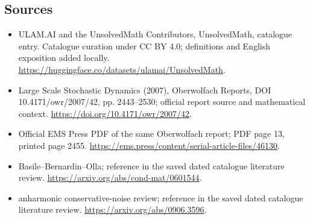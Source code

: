 \documentclass[11pt]{article}
\begin{document}
\subsection{Sources}
\begin{itemize}
\item[\hypertarget{source:statement:1}{S1}] ULAM.AI and the UnsolvedMath Contributors, UnsolvedMath, catalogue entry. Catalogue curation under CC BY 4.0; definitions and English exposition added locally.
\url{https://huggingface.co/datasets/ulamai/UnsolvedMath}.
\item[\hypertarget{source:statement:2}{S2}] Large Scale Stochastic Dynamics (2007), Oberwolfach Reports, DOI 10.4171/owr/2007/42, pp. 2443--2530; official report source and mathematical context.
\url{https://doi.org/10.4171/owr/2007/42}.
\item[\hypertarget{source:statement:3}{S3}] Official EMS Press PDF of the same Oberwolfach report; PDF page 13, printed page 2455.
\url{https://ems.press/content/serial-article-files/46130}.
\item[\hypertarget{source:statement:4}{S4}] Basile--Bernardin--Olla; reference in the saved dated catalogue literature review.
\url{https://arxiv.org/abs/cond-mat/0601544}.
\item[\hypertarget{source:statement:5}{S5}] anharmonic conservative-noise review; reference in the saved dated catalogue literature review.
\url{https://arxiv.org/abs/0906.3596}.
\end{itemize}
\label{end:statement}
\end{document}
